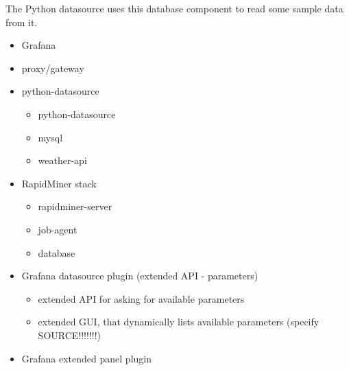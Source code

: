 The Python datasource uses this database component to read some sample data from it.




\begin{itemize}
	\item Grafana
	\item proxy/gateway
	\item python-datasource
	\begin{itemize}
		\item python-datasource
		\item mysql
		\item weather-api
	\end{itemize}
	\item RapidMiner stack
	\begin{itemize}
		\item rapidminer-server
		\item job-agent
		\item database
	\end{itemize}
	\item Grafana datasource plugin (extended API - parameters)
	\begin{itemize}
		\item extended API for asking for available parameters
		\item extended GUI, that dynamically lists available parameters (specify SOURCE!!!!!!!)
	\end{itemize}
	\item Grafana extended panel plugin
\end{itemize}